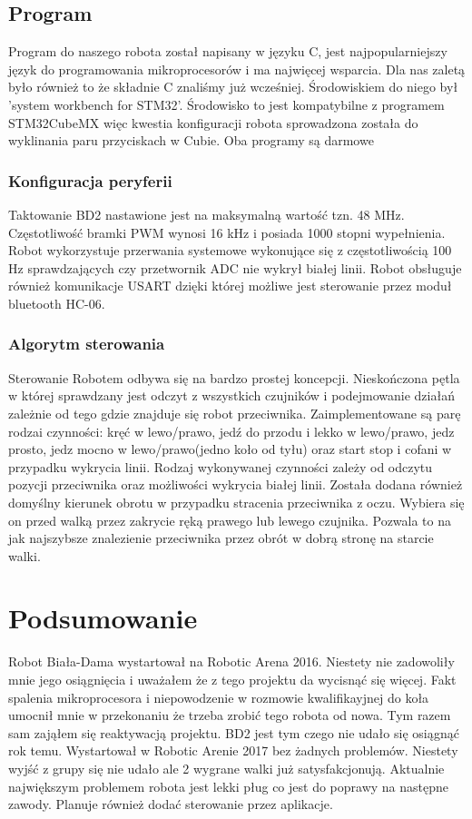 \documentclass[12pt,a4paper]{article}
\begin{document}
\subsection{Program}
Program do naszego robota został napisany w języku C, jest najpopularniejszy język do programowania mikroprocesorów i ma najwięcej wsparcia. Dla nas zaletą było również to że składnie C znaliśmy już wcześniej. Środowiskiem do niego był 'system workbench for STM32'. Środowisko to jest kompatybilne z programem STM32CubeMX więc kwestia konfiguracji robota sprowadzona została do wyklinania paru przyciskach w Cubie. Oba programy są darmowe 

\subsubsection{Konfiguracja peryferii}
Taktowanie BD2 nastawione jest na maksymalną wartość tzn. 48 MHz. Częstotliwość bramki PWM wynosi 16 kHz i posiada 1000 stopni wypełnienia. Robot wykorzystuje przerwania systemowe wykonujące się z częstotliwością 100 Hz sprawdzających czy przetwornik ADC nie wykrył białej linii. Robot obsługuje również komunikacje USART dzięki której możliwe jest sterowanie przez moduł bluetooth HC-06.

\subsubsection{Algorytm sterowania}
Sterowanie Robotem odbywa się na bardzo prostej koncepcji. Nieskończona pętla w której sprawdzany jest odczyt z wszystkich czujników i podejmowanie działań zależnie od tego gdzie znajduje się robot przeciwnika. Zaimplementowane są parę rodzai czynności: kręć w lewo/prawo, jedź do przodu i lekko w lewo/prawo, jedz prosto, jedz mocno w lewo/prawo(jedno koło od tyłu) oraz start stop i cofani w przypadku wykrycia linii. Rodzaj wykonywanej czynności zależy od odczytu pozycji przeciwnika oraz możliwości wykrycia białej linii. Została dodana również domyślny kierunek obrotu w przypadku stracenia przeciwnika z oczu. Wybiera się on przed walką przez zakrycie ręką prawego lub lewego czujnika. Pozwala to na jak najszybsze znalezienie przeciwnika przez obrót w dobrą stronę na starcie walki.


\section{Podsumowanie}
Robot Biała-Dama wystartował na Robotic Arena 2016. Niestety nie zadowoliły mnie jego osiągnięcia i uważałem że z tego projektu da wycisnąć się więcej. Fakt spalenia mikroprocesora i niepowodzenie w rozmowie kwalifikayjnej do koła umocnił mnie w przekonaniu że trzeba zrobić tego robota od nowa. Tym razem sam zająłem się reaktywacją projektu. BD2 jest tym czego nie udało się osiągnąć rok temu. Wystartował w Robotic Arenie 2017 bez żadnych problemów. Niestety wyjść z grupy się nie udało ale 2 wygrane walki już satysfakcjonują. Aktualnie największym problemem robota jest lekki pług co jest do poprawy na następne zawody. Planuje również dodać sterowanie przez aplikacje. 
\end{document}
